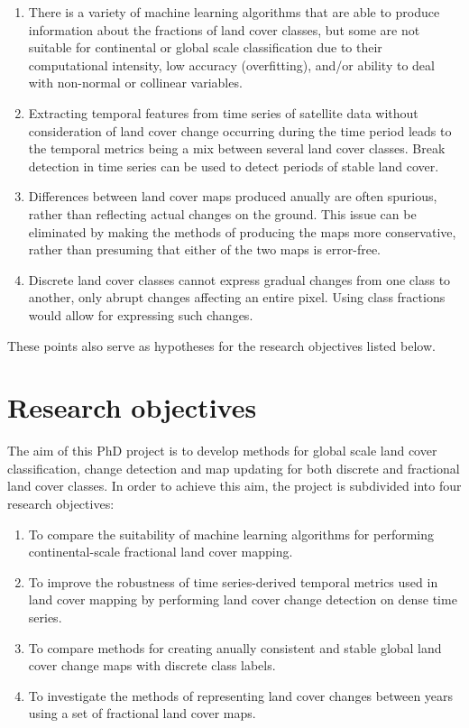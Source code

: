 \documentclass[10pt]{article}
\begin{document}
\begin{mdframed}[style=table,frametitle=\textbf{7. DETAILED DESCRIPTION OF THE RESEARCH PLAN} (max. 2500 words + 1 page literature list)]
\begin{enumerate}
 \item There is a variety of machine learning algorithms that are able to produce information about the fractions of land cover classes, but some are not suitable for continental or global scale classification due to their computational intensity, low accuracy (overfitting), and/or ability to deal with non-normal or collinear variables.
 \item Extracting temporal features from time series of satellite data without consideration of land cover change occurring during the time period leads to the temporal metrics being a mix between several land cover classes. Break detection in time series can be used to detect periods of stable land cover.
 \item Differences between land cover maps produced anually are often spurious, rather than reflecting actual changes on the ground. This issue can be eliminated by making the methods of producing the maps more conservative, rather than presuming that either of the two maps is error-free.
 \item Discrete land cover classes cannot express gradual changes from one class to another, only abrupt changes affecting an entire pixel. Using class fractions would allow for expressing such changes.
\end{enumerate}

These points also serve as hypotheses for the research objectives listed below.

\section{Research objectives}

The aim of this PhD project is to develop methods for global scale land cover classification, change detection and map updating for both discrete and fractional land cover classes. In order to achieve this aim, the project is subdivided into four research objectives:

\begin{enumerate}[label=RO\arabic*]
 \item \label{RO1} To compare the suitability of machine learning algorithms for performing continental-scale fractional land cover mapping.
 \item \label{RO2} To improve the robustness of time series-derived temporal metrics used in land cover mapping by performing land cover change detection on dense time series.
 \item \label{RO3} To compare methods for creating anually consistent and stable global land cover change maps with discrete class labels. %
 \item \label{RO4} To investigate the methods of representing land cover changes between years using a set of fractional land cover maps.
\end{enumerate}


\end{mdframed}
\end{document}
